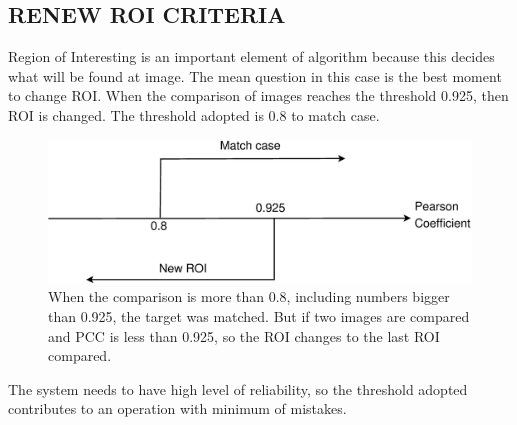 \subsection{RENEW ROI CRITERIA}
Region of Interesting is an important element of algorithm because this decides what will be found at image. The mean question in this case is 
the best moment to change ROI. When the comparison of images reaches the threshold 0.925, then ROI is changed. The threshold adopted is 0.8 to 
match case\cite{Eugene}.


\begin{figure}[H]
\includegraphics[width=\columnwidth]{images/figure3.eps}
\caption{When the comparison is more than 0.8, including numbers bigger than 0.925, the target was matched. But if two images are compared 
and PCC is less than 0.925, so the ROI changes to the last ROI compared.}
\end{figure}

The system needs to have high level of reliability, so the threshold adopted contributes to an operation with minimum of mistakes.
